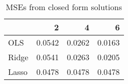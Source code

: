 \begin{table}[h]
\centering
\caption{MSEs from closed form solutions}
\label{tab:benchMarkMSE}\begin{tabular}{lrrr}
\toprule
 & 2 & 4 & 6 \\
\midrule
OLS & 0.0542 & 0.0262 & 0.0163 \\
Ridge & 0.0541 & 0.0263 & 0.0205 \\
Lasso & 0.0478 & 0.0478 & 0.0478 \\
\bottomrule
\end{tabular}
\end{table}

